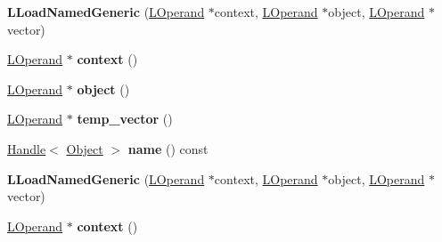 \begin{DoxyCompactItemize}
\item 
{\bfseries L\+Load\+Named\+Generic} (\hyperlink{classv8_1_1internal_1_1_l_operand}{L\+Operand} $\ast$context, \hyperlink{classv8_1_1internal_1_1_l_operand}{L\+Operand} $\ast$object, \hyperlink{classv8_1_1internal_1_1_l_operand}{L\+Operand} $\ast$vector)\hypertarget{classv8_1_1internal_1_1_l_load_named_generic_a6994bc2c7c479c721ec11114ed19423c}{}\label{classv8_1_1internal_1_1_l_load_named_generic_a6994bc2c7c479c721ec11114ed19423c}

\item 
\hyperlink{classv8_1_1internal_1_1_l_operand}{L\+Operand} $\ast$ {\bfseries context} ()\hypertarget{classv8_1_1internal_1_1_l_load_named_generic_a61d03d8bff411819ec103caee4b20d95}{}\label{classv8_1_1internal_1_1_l_load_named_generic_a61d03d8bff411819ec103caee4b20d95}

\item 
\hyperlink{classv8_1_1internal_1_1_l_operand}{L\+Operand} $\ast$ {\bfseries object} ()\hypertarget{classv8_1_1internal_1_1_l_load_named_generic_ac545174d6ce0223254278aa25992bcf1}{}\label{classv8_1_1internal_1_1_l_load_named_generic_ac545174d6ce0223254278aa25992bcf1}

\item 
\hyperlink{classv8_1_1internal_1_1_l_operand}{L\+Operand} $\ast$ {\bfseries temp\+\_\+vector} ()\hypertarget{classv8_1_1internal_1_1_l_load_named_generic_ac71e90a4f4d755276a1d76ac24d4ef3d}{}\label{classv8_1_1internal_1_1_l_load_named_generic_ac71e90a4f4d755276a1d76ac24d4ef3d}

\item 
\hyperlink{classv8_1_1internal_1_1_handle}{Handle}$<$ \hyperlink{classv8_1_1internal_1_1_object}{Object} $>$ {\bfseries name} () const \hypertarget{classv8_1_1internal_1_1_l_load_named_generic_a328fcd03d981c29639521ee005f3adc7}{}\label{classv8_1_1internal_1_1_l_load_named_generic_a328fcd03d981c29639521ee005f3adc7}

\item 
{\bfseries L\+Load\+Named\+Generic} (\hyperlink{classv8_1_1internal_1_1_l_operand}{L\+Operand} $\ast$context, \hyperlink{classv8_1_1internal_1_1_l_operand}{L\+Operand} $\ast$object, \hyperlink{classv8_1_1internal_1_1_l_operand}{L\+Operand} $\ast$vector)\hypertarget{classv8_1_1internal_1_1_l_load_named_generic_a6994bc2c7c479c721ec11114ed19423c}{}\label{classv8_1_1internal_1_1_l_load_named_generic_a6994bc2c7c479c721ec11114ed19423c}

\item 
\hyperlink{classv8_1_1internal_1_1_l_operand}{L\+Operand} $\ast$ {\bfseries context} ()\hypertarget{classv8_1_1internal_1_1_l_load_named_generic_a61d03d8bff411819ec103caee4b20d95}{}\label{classv8_1_1internal_1_1_l_load_named_generic_a61d03d8bff411819ec103caee4b20d95}


\end{DoxyCompactItemize}
